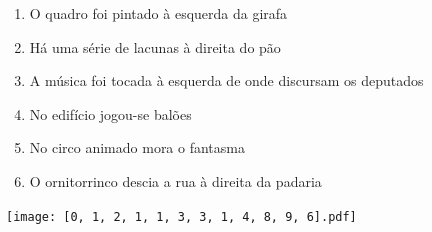 \documentclass[12pt]{article}
\begin{document}
		 

\pagebreak


	\begin{enumerate}
		  \sffamily %
		  \large %


\vfill \item
O quadro foi pintado	%
à esquerda
da girafa	%

\vfill \item
Há uma série de lacunas	%
à direita
do pão	%

\vfill \item
A música foi tocada	%
à esquerda
de onde discursam os deputados	%

\vfill \item
No edifício	%
jogou-se balões	%

\vfill \item
No circo animado	%
mora o fantasma	%

\vfill \item
O ornitorrinco descia a rua	%
à direita
da padaria	%
	\end{enumerate}
		  
		  \hfill

		  \vfill

\texttt{[image: [0, 1, 2, 1, 1, 3, 3, 1, 4, 8, 9, 6].pdf]}


	\hfill	  	  


\pagebreak			
\end{document}

